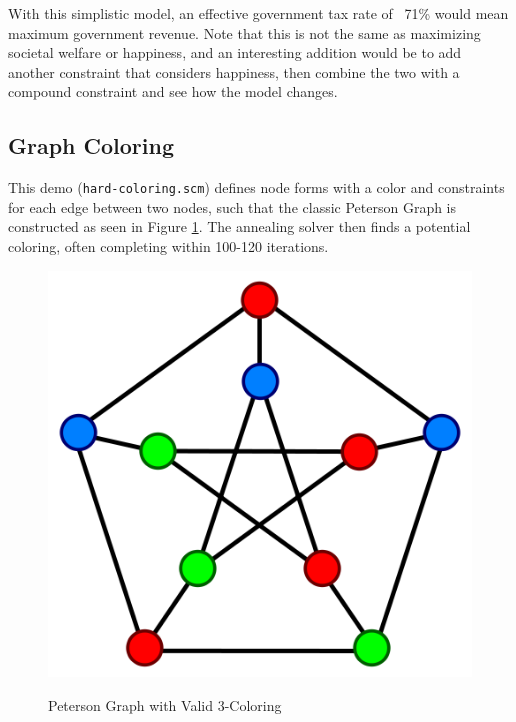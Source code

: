 \documentclass[12pt,a4paper]{article}
\begin{document}
With this simplistic model, an effective government tax rate of ~71\% would mean maximum government revenue.  Note that this is not the same as maximizing societal welfare or happiness, and an interesting addition would be to add another constraint that considers happiness, then combine the two with a compound constraint and see how the model changes.

\subsection{Graph Coloring}

This demo (\texttt{hard-coloring.scm}) defines node forms with a color and constraints for each edge between two nodes, such that the classic Peterson Graph is constructed as seen in Figure \ref{fig:Peterson}.  The annealing solver then finds a potential coloring, often completing within 100-120 iterations.
\begin{figure}[H]
\caption{Peterson Graph with Valid 3-Coloring}
\centering
\includegraphics[scale=.35]{peterson.png}
\label{fig:Peterson}
\end{figure}
\end{document}
